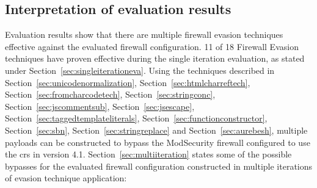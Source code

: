 \subsection{Interpretation of evaluation results}
\label{sec:evalinterpretation}
Evaluation results show that there are multiple firewall evasion techniques effective against the evaluated firewall configuration. 11 of 18 Firewall Evasion techniques have proven effective during the single iteration evaluation, as stated under Section~\ref{sec:singleiterationeva}.
Using the techniques described in Section~\ref{sec:unicodenormalization}, Section~\ref{sec:htmlcharreftech}, Section~\ref{sec:fromcharcodetech}, Section~\ref{sec:stringconc}, Section~\ref{sec:jscommentsub}, Section~\ref{sec:jsescape}, Section~\ref{sec:taggedtemplateliterals}, Section~\ref{sec:functionconstructor}, Section~\ref{sec:sbn}, Section~\ref{sec:stringreplace} and Section~\ref{sec:aurebesh}, multiple payloads can be constructed to bypass the ModSecurity firewall configured to use the \acrshort{crs} in version 4.1.
Section~\ref{sec:multiiteration} states some of the possible bypasses for the evaluated firewall configuration constructed in multiple iterations of evasion technique application:

